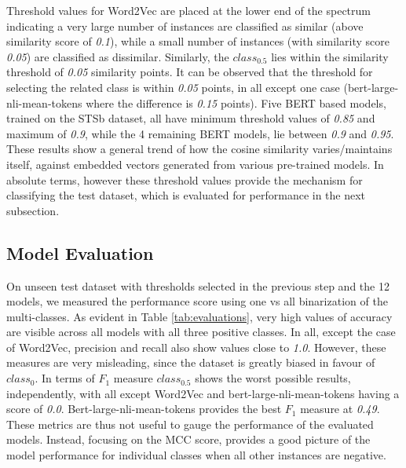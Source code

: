 \documentclass{ieeeaccess}
\begin{document}
Threshold values for Word2Vec are placed at the lower end of the spectrum indicating a very large number of instances are classified as similar (above similarity score of \textit{0.1}), while a small number of instances (with similarity score \textit{0.05}) are classified as dissimilar. Similarly, the $class_{0.5}$ lies within the similarity threshold of \textit{0.05} similarity points. It can be observed that the threshold for selecting the related class is within \textit{0.05} points, in all except one case (bert-large-nli-mean-tokens where the difference is \textit{0.15} points). Five BERT based models, trained on the STSb dataset, all have minimum threshold values of \textit{0.85} and maximum of \textit{0.9}, while the 4 remaining BERT models, lie between \textit{0.9} and \textit{0.95}. These results show a general trend of how the cosine similarity varies/maintains itself, against embedded vectors generated from various pre-trained models. In absolute terms, however these threshold values provide the mechanism for classifying the test dataset, which is evaluated for performance in the next subsection.

\subsection{Model Evaluation}
On unseen test dataset with thresholds selected in the previous step and the 12 models, we measured the performance score using one vs all binarization of the multi-classes. As evident in Table \ref{tab:evaluations}, very high values of accuracy are visible across all models with all three positive classes. In all, except the case of Word2Vec, precision and recall also show values close to \textit{1.0}. However, these measures are very misleading, since the dataset is greatly biased in favour of $class_0$. In terms of $F_1$ measure $class_{0.5}$ shows the worst possible results, independently, with all except Word2Vec and bert-large-nli-mean-tokens having a score of \textit{0.0}. Bert-large-nli-mean-tokens provides the best $F_1$ measure at \textit{0.49}. These metrics are thus not useful to gauge the performance of the evaluated models. Instead, focusing on the MCC score, provides a good picture of the model performance for individual classes when all other instances are negative.
\end{document}
